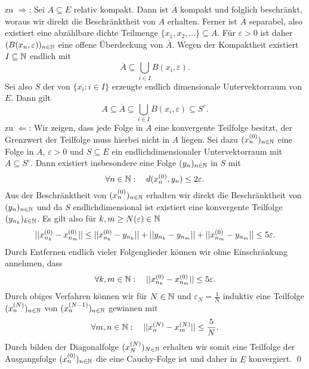 \begin{proof*}
    zu $\Rightarrow$: Sei $A \subseteq E$ relativ kompakt. Dann ist $\overline{A}$ kompakt und folglich beschränkt, woraus wir direkt die Beschränktheit von $A$ erhalten. 
    Ferner ist $\overline{A}$ separabel, also existiert eine abzählbare dichte Teilmenge $\{x_1, x_2,...\} \subseteq A$. 
    Für $\varepsilon > 0$ ist daher $(B(x_n, \varepsilon))_{n \in \mathbb{N}}$ eine offene Überdeckung von $\overline{A}$. Wegen der Kompaktheit existiert $I \subseteq \mathbb{N}$ endlich mit 
    $$
        \overline{A} \subseteq \bigcup_{i \in I}B(x_i, \varepsilon).
    $$
    Sei also $S$ der von $\{x_i : i \in I\}$ erzeugte endlich dimensionale Untervektorraum von $E$. Dann gilt 
    $$
        A \subseteq \overline{A} \subseteq \bigcup_{i \in I}B(x_i, \varepsilon) \subseteq S^{\varepsilon}.
    $$
    zu $\Leftarrow$: Wir zeigen, dass jede Folge in $A$ eine konvergente Teilfolge besitzt, der Grenzwert der Teilfolge muss hierbei nicht in $A$ liegen. 
    Sei dazu $(x^{(0)}_n)_{n \in \mathbb{N}}$ eine Folge in $A$, $\varepsilon > 0$ und $S \subseteq E$ ein endlichdimensionaler Untervektorraum mit $A \subseteq S^{\varepsilon}$. 
    Dann existiert insbesondere eine Folge $(y_n)_{n \in \mathbb{N}}$ in $S$ mit 
    $$
        \forall n \in \mathbb{N}: \quad d(x^{(0)}_n, y_n) \leq 2\varepsilon.
    $$
    Aus der Beschränktheit von $(x^{(0)}_n)_{n \in \mathbb{N}}$ erhalten wir direkt die Beschränktheit von $(y_n)_{n \in \mathbb{N}}$ und da $S$ endlichdimensional ist existiert eine konvergente Teilfolge $(y_{n_k})_{k \in \mathbb{N}}$.
    Es gilt also für $k,m \geq N(\varepsilon) \in \mathbb{N}$
    \begin{align*}
        \lvert\lvert x^{(0)}_{n_k} - x^{(0)}_{n_m} \rvert\rvert \leq \lvert\lvert x^{(0)}_{n_k} - y_{n_k} \rvert\rvert + \lvert\lvert y_{n_k} - y_{n_m} \rvert\rvert + \lvert\lvert x^{(0)}_{n_m} - y_{n_m} \rvert\rvert \leq 5\varepsilon. 
    \end{align*}
    Durch Entfernen endlich vieler Folgenglieder können wir ohne Einschränkung annehmen, dass 
    $$
        \forall k,m \in \mathbb{N}: \quad \lvert\lvert x^{(0)}_{n_k} - x^{(0)}_{n_m} \rvert\rvert \leq 5\varepsilon. 
    $$
    Durch obiges Verfahren können wir für $N \in \mathbb{N}$ und $\varepsilon_N = \frac{1}{N}$ induktiv eine Teilfolge $(x^{(N)}_n)_{n \in \mathbb{N}}$ von $(x^{(N-1)}_n)_{n \in \mathbb{N}}$ gewinnen mit
    $$
        \forall m,n \in \mathbb{N}: \quad \lvert\lvert x^{(N)}_n - x^{(N)}_m \rvert\rvert \leq \frac{5}{N}.
    $$
    Durch bilden der Diagonalfolge $(x^{(N)}_N)_{N \in \mathbb{N}}$ erhalten wir somit eine Teilfolge der Ausgangsfolge $(x^{(0)}_n)_{n \in \mathbb{N}}$ die eine Cauchy-Folge ist und daher in $E$ konvergiert. 
    \qed 
\end{proof*}

